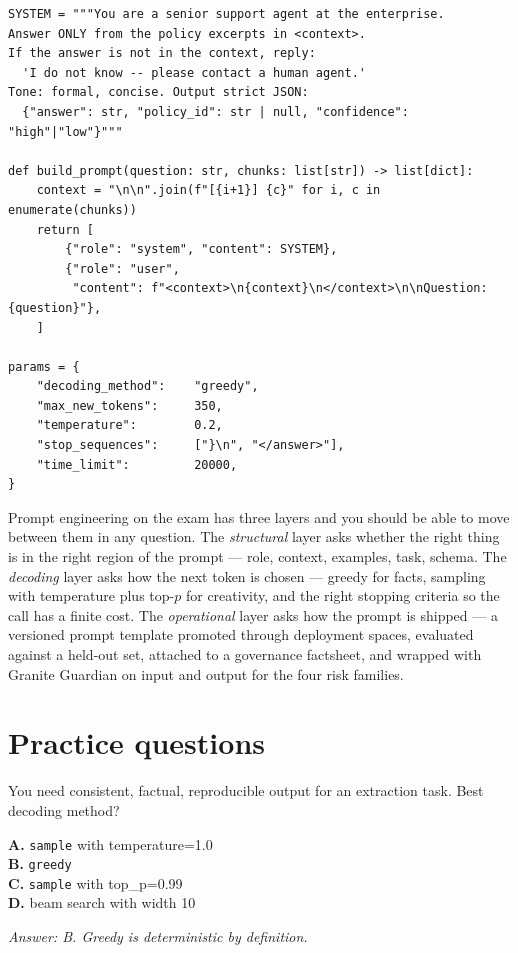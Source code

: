 \begin{examplebox}[title=\textbf{Reference production prompt skeleton}]
\begin{lstlisting}[style=pythonstyle]
SYSTEM = """You are a senior support agent at the enterprise.
Answer ONLY from the policy excerpts in <context>.
If the answer is not in the context, reply:
  'I do not know -- please contact a human agent.'
Tone: formal, concise. Output strict JSON:
  {"answer": str, "policy_id": str | null, "confidence": "high"|"low"}"""

def build_prompt(question: str, chunks: list[str]) -> list[dict]:
    context = "\n\n".join(f"[{i+1}] {c}" for i, c in enumerate(chunks))
    return [
        {"role": "system", "content": SYSTEM},
        {"role": "user",
         "content": f"<context>\n{context}\n</context>\n\nQuestion: {question}"},
    ]

params = {
    "decoding_method":    "greedy",
    "max_new_tokens":     350,
    "temperature":        0.2,
    "stop_sequences":     ["}\n", "</answer>"],
    "time_limit":         20000,
}
\end{lstlisting}
\end{examplebox}

\begin{takeawaybox}
Prompt engineering on the exam has three layers and you should be able to move between them in any question. The \emph{structural} layer asks whether the right thing is in the right region of the prompt --- role, context, examples, task, schema. The \emph{decoding} layer asks how the next token is chosen --- greedy for facts, sampling with temperature plus top-$p$ for creativity, and the right stopping criteria so the call has a finite cost. The \emph{operational} layer asks how the prompt is shipped --- a versioned prompt template promoted through deployment spaces, evaluated against a held-out set, attached to a governance factsheet, and wrapped with Granite Guardian on input and output for the four risk families.
\end{takeawaybox}

\section{Practice questions}

\begin{practicebox}[title=\textbf{Q2.1 --- Decoding}]
You need consistent, factual, reproducible output for an extraction task. Best decoding method?

\textbf{A.} \texttt{sample} with temperature=1.0\\
\textbf{B.} \texttt{greedy}\\
\textbf{C.} \texttt{sample} with top\_p=0.99\\
\textbf{D.} beam search with width 10

\vspace{0.2cm}\textit{Answer: B. Greedy is deterministic by definition.}
\end{practicebox}

